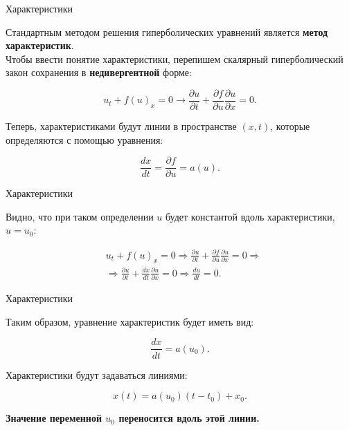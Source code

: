 \documentclass[10pt,xcolor=pst,aspectratio=169]{beamer}
\begin{document}
\begin{frame}{Характеристики}

    \transdissolve[duration=0.1]
    \justifying
    \large
    
    Стандартным методом решения гиперболических уравнений является \textbf{метод характеристик}.\\

    Чтобы ввести понятие характеристики, перепишем скалярный гиперболический закон сохранения в \textbf{недивергентной} форме:

    \[
        u_{t} + f(u)_{x} = 0 \rightarrow \frac{\partial u}{\partial t} + \frac{\partial f}{\partial u} \frac{\partial u}{\partial x} = 0.
    \]

    Теперь, характеристиками будут линии в пространстве $(x, t)$, которые определяются с помощью уравнения:

    \[
        \frac{d x}{d t} = \frac{\partial f}{\partial u} = a(u).
    \]

\end{frame}

\begin{frame}{Характеристики}

    \transdissolve[duration=0.1]
    \justifying
    \large

    Видно, что при таком определении $u$ будет константой вдоль характеристики, $u = u_{0}$:

    \[
        \begin{split}
            &u_{t} + f(u)_{x} = 0 \Rightarrow \frac{\partial u}{\partial t} + \frac{\partial f}{\partial u} \frac{\partial u}{\partial x} = 0 \Rightarrow \\
            &\Rightarrow \frac{\partial u}{\partial t} + \frac{d x}{d t} \frac{\partial u}{\partial x} = 0 \Rightarrow \frac{d u}{d t} = 0.
        \end{split}
    \]

\end{frame}

\begin{frame}{Характеристики}

    \transdissolve[duration=0.1]
    \justifying
    \large

    Таким образом, уравнение характеристик будет иметь вид:

    \[
        \frac{d x}{d t} = a(u_{0}).
    \]

    Характеристики будут задаваться линиями:

    \[
        x(t) = a(u_{0}) (t - t_{0}) + x_{0}.
    \]

    \textbf{Значение переменной $u_0$ переносится вдоль этой линии.}

\end{frame}
\end{document}
